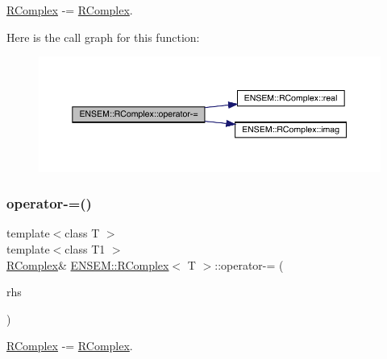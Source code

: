 \mbox{\hyperlink{classENSEM_1_1RComplex}{R\+Complex}} -\/= \mbox{\hyperlink{classENSEM_1_1RComplex}{R\+Complex}}. 

Here is the call graph for this function\+:
\nopagebreak
\begin{figure}[H]
\begin{center}
\leavevmode
\includegraphics[width=350pt]{d9/d0e/classENSEM_1_1RComplex_aa2ad7391f0a0df5381ae7402b8b1fdb8_cgraph}
\end{center}
\end{figure}
\mbox{\label{classENSEM_1_1RComplex_aa2ad7391f0a0df5381ae7402b8b1fdb8}} 
\subsubsection{\texorpdfstring{operator-\/=()}{operator-=()}\hspace{0.1cm}{\footnotesize\ttfamily [4/4]}}
{\footnotesize\ttfamily template$<$class T $>$ \\
template$<$class T1 $>$ \\
\mbox{\hyperlink{classENSEM_1_1RComplex}{R\+Complex}}\& \mbox{\hyperlink{classENSEM_1_1RComplex}{E\+N\+S\+E\+M\+::\+R\+Complex}}$<$ T $>$\+::operator-\/= (\begin{DoxyParamCaption}\item[{const \mbox{\hyperlink{classENSEM_1_1RComplex}{R\+Complex}}$<$ T1 $>$ \&}]{rhs }\end{DoxyParamCaption})\hspace{0.3cm}{\ttfamily [inline]}}



\mbox{\hyperlink{classENSEM_1_1RComplex}{R\+Complex}} -\/= \mbox{\hyperlink{classENSEM_1_1RComplex}{R\+Complex}}. 

